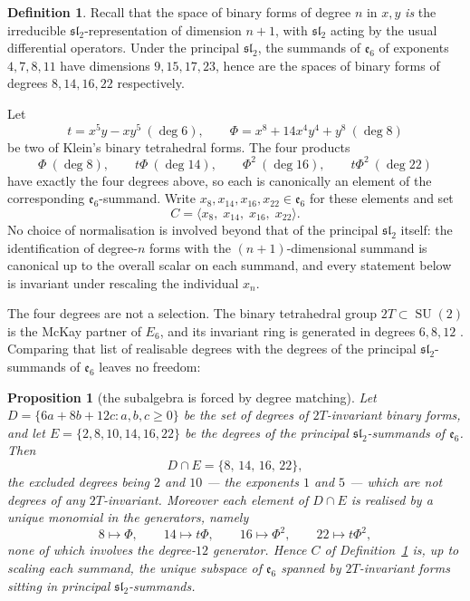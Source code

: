 \documentclass[11pt,a4paper]{article}
\newtheorem{proposition}[theorem]{Proposition}
\theoremstyle{definition}
\newtheorem{definition}[theorem]{Definition}
\theoremstyle{remark}
\newcommand{\esix}{\mathfrak{e}_6}
\newcommand{\slt}{\mathfrak{sl}_2}
\newcommand{\SU}{\operatorname{SU}}
\begin{document}
\begin{definition}\label{def:C}
Recall that the space of binary forms of degree $n$ in $x,y$ \emph{is} the irreducible
$\slt$-representation of dimension $n+1$, with $\slt$ acting by the usual differential
operators. Under the principal $\slt$, the summands of $\esix$ of exponents $4,7,8,11$ have
dimensions $9,15,17,23$, hence are the spaces of binary forms of degrees $8,14,16,22$
respectively.

Let
\[
   t=x^5y-xy^5\ (\deg 6),\qquad \Phi=x^8+14x^4y^4+y^8\ (\deg 8)
\]
be two of Klein's binary tetrahedral forms. The four products
\[
   \Phi\ (\deg 8),\qquad t\Phi\ (\deg 14),\qquad \Phi^2\ (\deg 16),\qquad t\Phi^2\ (\deg 22)
\]
have exactly the four degrees above, so each is canonically an element of the corresponding
$\esix$-summand. Write $x_8,x_{14},x_{16},x_{22}\in\esix$ for these elements and set
\[
   C=\langle x_8,\;x_{14},\;x_{16},\;x_{22}\rangle .
\]
No choice of normalisation is involved beyond that of the principal $\slt$ itself: the
identification of degree-$n$ forms with the $(n+1)$-dimensional summand is canonical up to the
overall scalar on each summand, and every statement below is invariant under rescaling the
individual $x_n$.
\end{definition}

The four degrees are not a selection. The binary tetrahedral group $2T\subset\SU(2)$ is the
McKay partner of $E_6$, and its invariant ring is generated in degrees $6,8,12$
\cite{Klein,McKay}. Comparing that list of realisable degrees with the degrees of the principal
$\slt$-summands of $\esix$ leaves no freedom:

\begin{proposition}[the subalgebra is forced by degree matching]\label{prop:forced}
Let $D=\{6a+8b+12c: a,b,c\ge0\}$ be the set of degrees of $2T$-invariant binary forms, and let
$E=\{2,8,10,14,16,22\}$ be the degrees of the principal $\slt$-summands of $\esix$. Then
\[
   D\cap E=\{8,\,14,\,16,\,22\},
\]
the excluded degrees being $2$ and $10$ --- the exponents $1$ and $5$ --- which are not degrees
of any $2T$-invariant. Moreover each element of $D\cap E$ is realised by a \emph{unique}
monomial in the generators, namely
\[
   8\mapsto\Phi,\qquad 14\mapsto t\Phi,\qquad 16\mapsto\Phi^2,\qquad 22\mapsto t\Phi^2 ,
\]
none of which involves the degree-$12$ generator. Hence $C$ of Definition~\ref{def:C} is, up to
scaling each summand, the \emph{unique} subspace of $\esix$ spanned by $2T$-invariant forms
sitting in principal $\slt$-summands.
\end{proposition}
\end{document}
